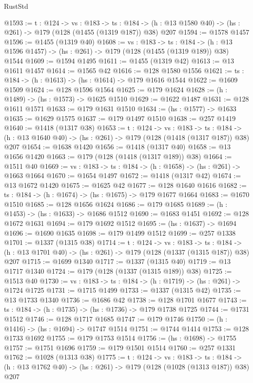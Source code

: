 \begin{lexlean}{RustStd}
\begin{coremodule}
{\begin{coremodule}
{{{{{@1593 := {t : @124} ->
  {vs : @183} ->
  {ts : @184} -> (h : @13 @1580 @40) -> (hs : @261) -> @179 (@128 (@1455 (@1319 @187)) @38) @207
@1594 := @1578 @1457
@1596 := @1455 (@1319 @40)
@1608 := {vs : @183} ->
  {ts : @184} -> (h : @13 @1596 @1457) -> (hs : @261) -> @179 (@128 (@1455 (@1319 @189)) @38) @1544
@1609 := @1594 @1495
@1611 := @1455 (@1319 @42)
@1613 := @13 @1611 @1457
@1614 := @1565 @42
@1616 := @128 @1580 @1556
@1621 := {ts : @184} -> (h : @1613) -> (hs : @1614) -> @179 @1616 @1544
@1622 := @1609 @1509
@1624 := @128 @1596 @1564
@1625 := @179 @1624
@1628 := (h : @1489) -> (hs : @1573) -> @1625 @1510
@1629 := @1622 @1487
@1631 := @128 @1611 @1571
@1633 := @179 @1631 @1510
@1634 := (hs : @1577) -> @1633
@1635 := @1629 @1575
@1637 := @179 @1497 @1510
@1638 := @257 @1419
@1640 := @1418 (@1317 @38)
@1653 := {t : @124} ->
  {vs : @183} ->
  {ts : @184} -> (h : @13 @1640 @40) -> (hs : @261) -> @179 (@128 (@1418 (@1317 @187)) @38) @207
@1654 := @1638 @1420
@1656 := @1418 (@1317 @40)
@1658 := @13 @1656 @1420
@1663 := @179 (@128 (@1418 (@1317 @189)) @38)
@1664 := @1511 @40
@1669 := {vs : @183} -> {ts : @184} -> (h : @1658) -> (hs : @261) -> @1663 @1664
@1670 := @1654 @1497
@1672 := @1418 (@1317 @42)
@1674 := @13 @1672 @1420
@1675 := @1625 @42
@1677 := @128 @1640 @1616
@1682 := {ts : @184} -> (h : @1674) -> (hs : @1675) -> @179 @1677 @1664
@1683 := @1670 @1510
@1685 := @128 @1656 @1624
@1686 := @179 @1685
@1689 := (h : @1453) -> (hs : @1633) -> @1686 @1512
@1690 := @1683 @1451
@1692 := @128 @1672 @1631
@1694 := @179 @1692 @1512
@1695 := (hs : @1637) -> @1694
@1696 := @1690 @1635
@1698 := @179 @1499 @1512
@1699 := @257 @1338
@1701 := @1337 (@1315 @38)
@1714 := {t : @124} ->
  {vs : @183} ->
  {ts : @184} -> (h : @13 @1701 @40) -> (hs : @261) -> @179 (@128 (@1337 (@1315 @187)) @38) @207
@1715 := @1699 @1340
@1717 := @1337 (@1315 @40)
@1719 := @13 @1717 @1340
@1724 := @179 (@128 (@1337 (@1315 @189)) @38)
@1725 := @1513 @40
@1730 := {vs : @183} -> {ts : @184} -> (h : @1719) -> (hs : @261) -> @1724 @1725
@1731 := @1715 @1499
@1733 := @1337 (@1315 @42)
@1735 := @13 @1733 @1340
@1736 := @1686 @42
@1738 := @128 @1701 @1677
@1743 := {ts : @184} -> (h : @1735) -> (hs : @1736) -> @179 @1738 @1725
@1744 := @1731 @1512
@1746 := @128 @1717 @1685
@1747 := @179 @1746
@1750 := (h : @1416) -> (hs : @1694) -> @1747 @1514
@1751 := @1744 @1414
@1753 := @128 @1733 @1692
@1755 := @179 @1753 @1514
@1756 := (hs : @1698) -> @1755
@1757 := @1751 @1696
@1759 := @179 @1501 @1514
@1760 := @257 @1331
@1762 := @1028 (@1313 @38)
@1775 := {t : @124} ->
  {vs : @183} ->
  {ts : @184} -> (h : @13 @1762 @40) -> (hs : @261) -> @179 (@128 (@1028 (@1313 @187)) @38) @207
}}}}}
\end{coremodule}}
\end{coremodule}
\end{lexlean}
